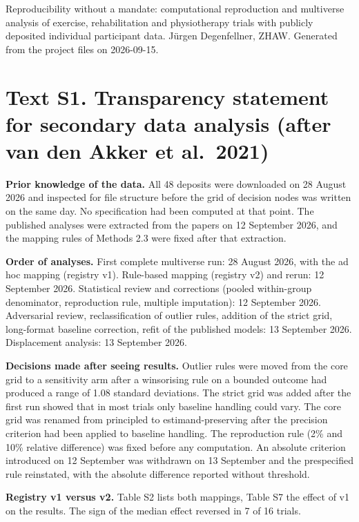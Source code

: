 Reproducibility without a mandate: computational reproduction and multiverse analysis of exercise, rehabilitation and physiotherapy trials with publicly deposited individual participant data. Jürgen Degenfellner, ZHAW. Generated from the project files on 2026-09-15.

\section{Text S1. Transparency statement for secondary data analysis (after van den Akker et al.~2021)}\label{text-s1.-transparency-statement-for-secondary-data-analysis-after-van-den-akker-et-al.-2021}

\textbf{Prior knowledge of the data.} All 48 deposits were downloaded on 28 August 2026 and inspected for file structure before the grid of decision nodes was written on the same day. No specification had been computed at that point. The published analyses were extracted from the papers on 12 September 2026, and the mapping rules of Methods 2.3 were fixed after that extraction.

\textbf{Order of analyses.} First complete multiverse run: 28 August 2026, with the ad hoc mapping (registry v1). Rule-based mapping (registry v2) and rerun: 12 September 2026. Statistical review and corrections (pooled within-group denominator, reproduction rule, multiple imputation): 12 September 2026. Adversarial review, reclassification of outlier rules, addition of the strict grid, long-format baseline correction, refit of the published models: 13 September 2026. Displacement analysis: 13 September 2026.

\textbf{Decisions made after seeing results.} Outlier rules were moved from the core grid to a sensitivity arm after a winsorising rule on a bounded outcome had produced a range of 1.08 standard deviations. The strict grid was added after the first run showed that in most trials only baseline handling could vary. The core grid was renamed from principled to estimand-preserving after the precision criterion had been applied to baseline handling. The reproduction rule (2\% and 10\% relative difference) was fixed before any computation. An absolute criterion introduced on 12 September was withdrawn on 13 September and the prespecified rule reinstated, with the absolute difference reported without threshold.

\textbf{Registry v1 versus v2.} Table S2 lists both mappings, Table S7 the effect of v1 on the results. The sign of the median effect reversed in 7 of 16 trials.

